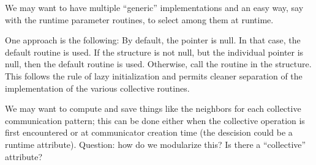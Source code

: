 We may want to have multiple ``generic'' implementations and an easy
way, say with the runtime parameter routines, to select among them at
runtime.

One approach is the following:
By default, the  pointer is null.  In that
case, the default routine is used.  If the structure is not null, but
the individual pointer is null, then the default routine is used.
Otherwise, call the routine in the structure.  This follows the rule
of lazy initialization and permits cleaner separation of the
implementation of the various collective routines.  

We may want to compute and save things like the neighbors for each
collective communication pattern; this can be done either when the
collective operation is first encountered or at communicator creation
time (the descision could be a runtime attribute).  Question: how do
we modularize this?  Is there a ``collective'' 
attribute?

